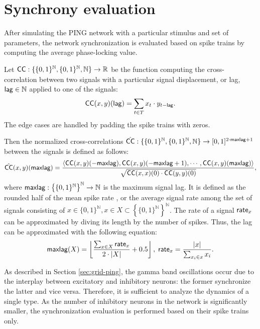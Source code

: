 \section{Synchrony evaluation}
\label{sec:sync-evaluation}

After simulating the PING network with a particular stimulus and set of parameters, the network synchronization is evaluated based on spike trains by computing the average phase-locking value.

Let $\mathsf{CC}: \{\{0, 1\}^\mathbb{N}, \{0, 1\}^\mathbb{N}, \mathbb{N}\} \to \mathbb{R}$ be the function computing the cross-correlation between two signals with a particular signal displacement, or lag, $\mathsf{lag} \in \mathbb{N}$ applied to one of the signals:
\begin{equation}
    \mathsf{CC} (x, y) (\mathsf{lag}) = 
    \sum_{t \in T} 
    x_t \cdot y_{t-\mathsf{lag}}.
\end{equation}
The edge cases are handled by padding the spike trains with zeros.

Then the normalized cross-correlations $\hat{\mathsf{CC}}: \{\{0, 1\}^\mathbb{N}, \{0, 1\}^\mathbb{N}, \mathbb{N}\} \to [0, 1]^{2 \cdot \mathsf{maxlag} + 1}$ between the signals is defined as follows:
\begin{equation}
    \hat{\mathsf{CC}}(x, y)(\mathsf{maxlag}) = 
    \frac{
        \left<
            \mathsf{CC}(x, y)(-\mathsf{maxlag}),
            \mathsf{CC}(x, y)(-\mathsf{maxlag} + 1),
            \cdots,
            \mathsf{CC}(x, y)(\mathsf{maxlag})
        \right>
    }{
        \sqrt{\mathsf{CC}(x, x)(0) \cdot \mathsf{CC}(y, y)(0)}
    },
\end{equation}
where $\mathsf{maxlag}: \left\{\{0, 1\}^\mathbb{N}\right\}^\mathbb{N} \to \mathbb{N}$ is the maximum signal lag. It is defined as the rounded half of the mean spike rate \cite{Lowet2015}, or the average signal rate among the set of signals consisting of $x \in \{0, 1\}^\mathbb{N}, x \in X \subset \left\{\{0, 1\}^\mathbb{N}\right\}^\mathbb{N}$. The rate of a signal $\mathsf{rate}_x$ can be approximated by diving its length by the number of spikes. Thus, the lag can be approximated with the following equation:
\begin{equation}
    \mathsf{maxlag}(X) = \left\lfloor 
        \frac{
            \sum_{x \in X} \mathsf{rate}_x
        }{
            2 \cdot |X|
        }
        + 0.5
     \right\rfloor, 
    \;
    \mathsf{rate}_x = \frac{
        |x|
    }{
        \sum_{x_i \in x} x_i
    }.
\end{equation}

As described in Section \ref{sec:grid-ping}, the gamma band oscillations occur due to the interplay between excitatory and inhibitory neurons: the former synchronize the latter and vice versa. Therefore, it is sufficient to analyze the dynamics of a single type. As the number of inhibitory neurons in the network is significantly smaller, the synchronization evaluation is performed based on their spike trains only. 


